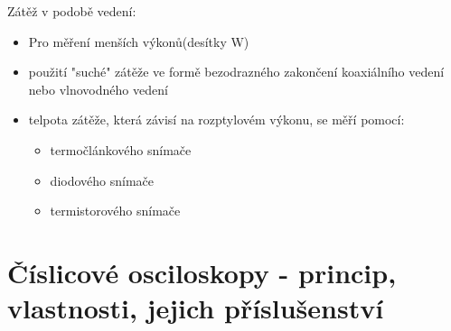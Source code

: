 Zátěž v podobě vedení:
\begin{itemize}
    \item Pro měření menších výkonů(desítky W)
    \item použití "suché" zátěže ve formě bezodrazného zakončení koaxiálního vedení nebo vlnovodného vedení
    \item telpota zátěže, která závisí na rozptylovém výkonu, se měří pomocí:
    \begin{itemize}
        \item termočlánkového snímače
        \item diodového snímače
        \item termistorového snímače
    \end{itemize}
\end{itemize}

\section{Číslicové osciloskopy - princip, vlastnosti, jejich příslušenství}




